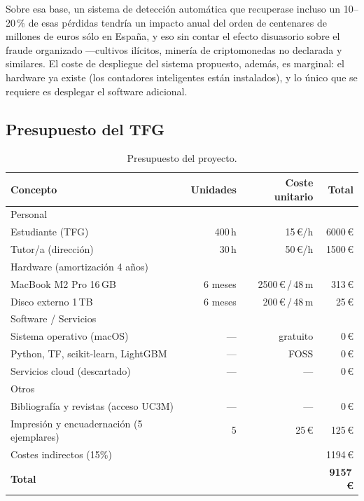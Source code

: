 Sobre esa base, un sistema de detección automática que recuperase incluso un 10--20\,\% de esas pérdidas tendría un impacto anual del orden de centenares de millones de euros sólo en España, y eso sin contar el efecto disuasorio sobre el fraude organizado ---cultivos ilícitos, minería de criptomonedas no declarada y similares. El coste de despliegue del sistema propuesto, además, es marginal: el hardware ya existe (los contadores inteligentes están instalados), y lo único que se requiere es desplegar el software adicional.

\subsection{Presupuesto del TFG}

\begin{table}[H]
\centering
\caption{Presupuesto del proyecto.}
\label{tab:presupuesto}
\small
\begin{tabularx}{\textwidth}{X r r r}
\toprule
Concepto & Unidades & Coste unitario & Total \\
\midrule
Personal & & & \\
\quad Estudiante (TFG)         & 400\,h    & 15\,\euro/h & 6000\,\euro \\
\quad Tutor/a (dirección)      & 30\,h     & 50\,\euro/h & 1500\,\euro \\
\midrule
Hardware (amortización 4 años) & & & \\
\quad MacBook M2 Pro 16\,GB    & 6 meses   & 2500\,\euro\,/\,48\,m & 313\,\euro \\
\quad Disco externo 1\,TB      & 6 meses   & 200\,\euro\,/\,48\,m  & 25\,\euro \\
\midrule
Software / Servicios & & & \\
\quad Sistema operativo (macOS)         & ---       & gratuito     & 0\,\euro \\
\quad Python, TF, scikit-learn, LightGBM & ---       & FOSS         & 0\,\euro \\
\quad Servicios cloud (descartado)      & ---       & ---          & 0\,\euro \\
\midrule
Otros & & & \\
\quad Bibliografía y revistas (acceso UC3M)        & ---       & ---       & 0\,\euro \\
\quad Impresión y encuadernación (5 ejemplares)    & 5         & 25\,\euro   & 125\,\euro \\
\midrule
Costes indirectos (15\%)        &           &              & 1194\,\euro \\
\midrule
\textbf{Total}                  &           &              & \textbf{9157\,\euro} \\
\bottomrule
\end{tabularx}
\end{table}

